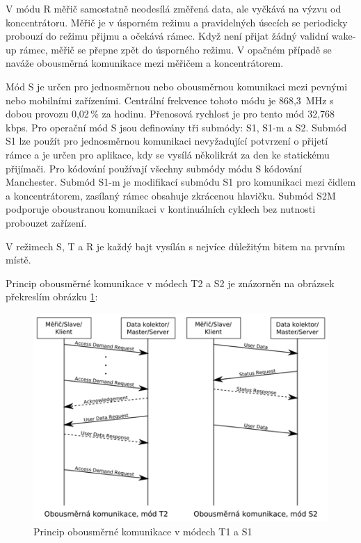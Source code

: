 V	módu R měřič samostatně neodesílá změřená data, ale vyčkává na výzvu od koncentrátoru. Měřič je v úsporném režimu a pravidelných úsecích se periodicky probouzí do režimu přijmu a očekává rámec. Když není přijat žádný validní wake-up rámec, měřič se přepne zpět do úsporného režimu. V	opačném případě se naváže obousměrná komunikace mezi měřičem a koncentrátorem.


Mód S je určen pro jednosměrnou nebo obousměrnou komunikaci mezi pevnými nebo mobilními zařízeními. Centrální frekvence tohoto módu je 868,3\, MHz s dobou provozu 0,02\,\% za hodinu. Přenosová rychlost je pro tento mód 32,768\,kbps. Pro operační mód S jsou definovány tři submódy: S1, S1-m a S2. Submód S1 lze použít pro jednosměrnou komunikaci nevyžadující potvrzení o přijetí rámce a je určen pro aplikace, kdy se vysílá několikrát za den ke statickému přijímači. Pro kódování používají všechny submódy módu S kódování Manchester.  
Submód S1-m je modifikací submódu S1 pro komunikaci mezi čidlem a koncentrátorem, zasílaný rámec obsahuje zkrácenou hlavičku.
Submód S2M podporuje oboustranou komunikaci v kontinuálních cyklech bez nutnosti probouzet zařízení.

V režimech S, T a R je každý bajt vysílán s nejvíce důležitým bitem na prvním místě.


Princip obousměrné komunikace v módech T2 a S2 je znázorněn na \colorbox[rgb]{0,1,0}{obrázsek překreslím} obrázku \ref{ObrazekObousmerny}:

\begin{figure}[!ht]
 \begin{center}
    \includegraphics[scale=1.0]{obrazky/wmbus_obousmerne}
  \end{center}
  \caption{Princip obousměrné komunikace v módech T1 a S1}
	\label{ObrazekObousmerny}
\end{figure}

